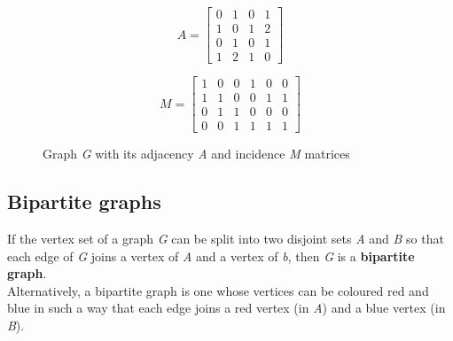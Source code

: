 \begin{figure}[H]
    \centering
    \begin{minipage}{0.5\textwidth}
        \centering
    \end{minipage}%
    \begin{minipage}{0.5\textwidth}
        \[
        A = \begin{bmatrix}
        0 & 1 & 0 & 1 \\
        1 & 0 & 1 & 2 \\
        0 & 1 & 0 & 1 \\
        1 & 2 & 1 & 0
        \end{bmatrix}
        \]
        
        \[
        M = \begin{bmatrix}
        1 & 0 & 0 & 1 & 0 & 0 \\
        1 & 1 & 0 & 0 & 1 & 1 \\
        0 & 1 & 1 & 0 & 0 & 0 \\
        0 & 0 & 1 & 1 & 1 & 1
        \end{bmatrix}
        \]
    \end{minipage}
    \caption{Graph \textit{G} with its adjacency \textit{A} and incidence \textit{M} matrices}
    \label{fig:matrix_representations}
\end{figure}


\subsection{Bipartite graphs}
If the vertex set of a graph \textit{G} can be split into two disjoint sets \textit{A} and \textit{B} so that each
edge of \textit{G} joins a vertex of \textit{A} and a vertex of \textit{b}, then \textit{G} is a \textbf{bipartite graph}. \\
Alternatively, a bipartite graph is one whose vertices can be coloured red and blue in such a way that each edge joins a red vertex (in \textit{A}) and a blue vertex (in \textit{B}). \\

